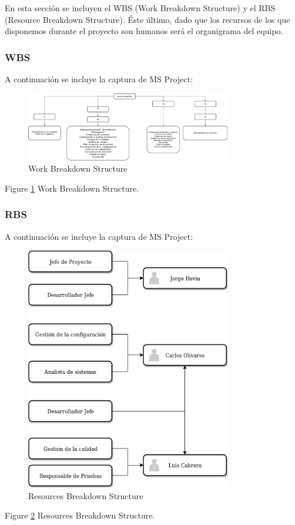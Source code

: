 \par En esta sección se incluyen el WBS (Work Breakdown Structure) y el RBS (Resource Breakdown Structure). Éste último, dado que los recursos de los que disponemos durante el proyecto son humanos será el organigrama del equipo.

\subsubsection{WBS}
\par A continuación se incluye la captura de MS Project:
\begin{figure}
  \centering
    \includegraphics[width=0.8\textwidth]{img/WBS.jpeg}
  \caption{Work Breakdown Structure}
  \label{fig:wbs}
\end{figure}
Figure \ref{fig:wbs} Work Breakdown Structure.


\subsubsection{RBS}
\par A continuación se incluye la captura de MS Project:
\begin{figure}
  \centering
    \includegraphics[width=0.8\textwidth]{img/RBS.jpeg}
  \caption{Resources Breakdown Structure}
  \label{fig:rbs}
\end{figure}
Figure \ref{fig:rbs} Resources Breakdown Structure.
